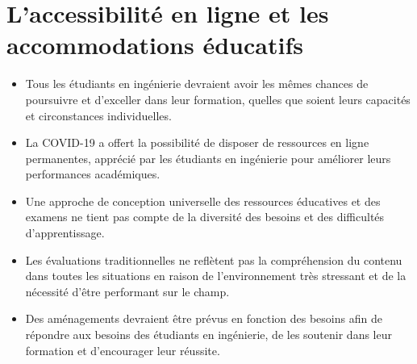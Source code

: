 \section{L'accessibilité en ligne et les accommodations éducatifs}\label{laccessibilite-en-ligne-et-les-accommodations-educatifs}



\begin{itemize}
 \item Tous les étudiants en ingénierie devraient avoir les mêmes chances de poursuivre et d'exceller dans leur formation, quelles que soient leurs capacités et circonstances individuelles.
 \item La COVID-19 a offert la possibilité de disposer de ressources en ligne permanentes, apprécié par les étudiants en ingénierie pour améliorer leurs performances académiques.
 \item Une approche de conception universelle des ressources éducatives et des examens ne tient pas compte de la diversité des besoins et des difficultés d'apprentissage.
 \item Les évaluations traditionnelles ne reflètent pas la compréhension du contenu dans toutes les situations en raison de l'environnement très stressant et de la nécessité d'être performant sur le champ.
 \item Des aménagements devraient être prévus en fonction des besoins afin de répondre aux besoins des étudiants en ingénierie, de les soutenir dans leur formation et d'encourager leur réussite.
\end{itemize}

